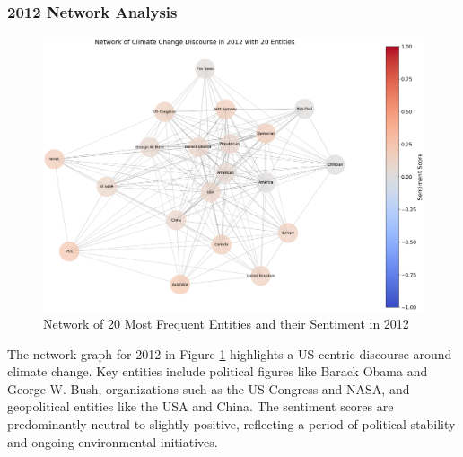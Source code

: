 \subsubsection{2012 Network Analysis}
\begin{figure}[h]
    \includegraphics[width=\textwidth]{images/topic_details/entities/network_analysis_top20_2012_spring.png}
    \caption{Network of 20 Most Frequent Entities and their Sentiment in 2012}
    \label{fig:network_2012}
\end{figure}
The network graph for 2012 in Figure \ref{fig:network_2012} highlights a US-centric discourse around climate change. Key entities include political figures like Barack Obama and George W. Bush, organizations such as the US Congress and NASA, and geopolitical entities like the USA and China. The sentiment scores are predominantly neutral to slightly positive, reflecting a period of political stability and ongoing environmental initiatives.

